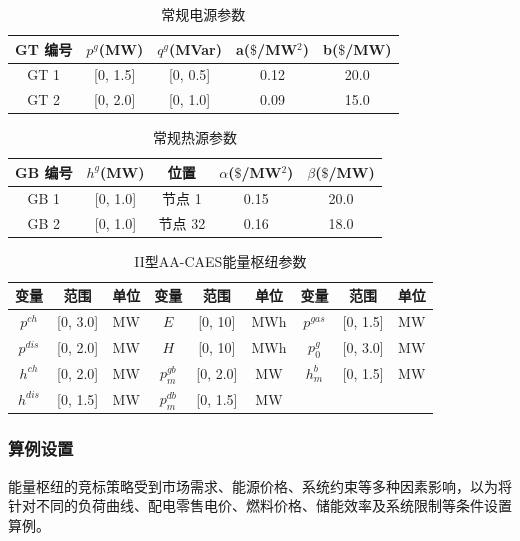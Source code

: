 \begin{table}[!htp]
\scriptsize
\renewcommand{\arraystretch}{1.3}
\renewcommand{\tabcolsep}{1em}
\caption{常规电源参数}
\centering
\begin{tabular}{ccccc}
\toprule
GT 编号 &$p^{g}$(MW) & $q^{g}$(MVar) & a($\$$/MW$^2$)&b($\$$/MW)\\
\midrule
 GT 1  &  [0, 1.5]  &  [0, 0.5]  &   0.12   &   20.0   \\
 GT 2  &  [0, 2.0]  &  [0, 1.0]  &   0.09   &   15.0   \\
\bottomrule
\end{tabular}
\label{tab:ParaGen-GT}
\end{table}

\begin{table}[!htp]
\scriptsize
\renewcommand{\arraystretch}{1.3}
\renewcommand{\tabcolsep}{1em}
\caption{常规热源参数}
\centering
\begin{tabular}{ccccc}
\toprule
GB 编号 &$h^{g}$(MW)& 位置& $\alpha$($\$$/MW$^2$) & $\beta$($\$$/MW)\\
\midrule
 GB 1  &  [0, 1.0]  &  节点 1    &   0.15   &   20.0   \\
 GB 2  &  [0, 1.0]  &  节点 32   &   0.16   &   18.0   \\
\bottomrule
\end{tabular}
\label{tab:ParaGen-GB}
\end{table}

\begin{table}[!htp]
\scriptsize
\renewcommand{\arraystretch}{1.3}
\renewcommand{\tabcolsep}{1em}
\caption{II型AA-CAES能量枢纽参数}
\centering
\begin{tabular}{ccccccccc}
\toprule
 变量   &  范围  & 单位 &  变量 &  范围 & 单位 & 变量 &  范围 & 单位 \\
\midrule
$p^{ch}$  & [0, 3.0] & MW & $E$ & [0, 10] & MWh &  $p^{gas}$ & [0, 1.5] & MW \\
$p^{dis}$ & [0, 2.0] & MW & $H$ & [0, 10] & MWh &  $p_0^g$   & [0, 3.0] & MW  \\
$h^{ch}$  & [0, 2.0] & MW & $p_m^{gb}$ & [0, 2.0] & MW & $h_m^b$ & [0, 1.5] & MW \\
$h^{dis}$ & [0, 1.5] & MW & $p_m^{db}$ & [0, 1.5] & MW & & &\\
\bottomrule
\end{tabular}
\label{tab:ParaHub}
\end{table}

\subsubsection{算例设置}
能量枢纽的竞标策略受到市场需求、能源价格、系统约束等多种因素影响，以为将针对不同的负荷曲线、配电零售电价、燃料价格、储能效率及系统限制等条件设置算例。

